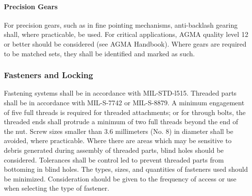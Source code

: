 \documentclass[12pt]{article}
\begin{document}
\paragraph{Precision Gears} %
For precision gears, such as in fine pointing mechanisms, anti-backlash gearing shall, where practicable, be used.
For critical applications, AGMA quality level 12 or better should be considered (see AGMA Handbook).
Where gears are required to be matched sets, they shall be identified and marked as such.

\subsubsection{Fasteners and Locking} %
Fastening systems shall be in accordance with MIL-STD-l515.
Threaded parts shall be in accordance with MIL-S-7742 or MIL-S-8879. 
A minimum engagement of five full threads is required for threaded attachments; or for through bolts, the threaded ends shall protrude a minimum of two full threads beyond the end of the nut. 
Screw sizes smaller than 3.6 millimeters (No. 8) in diameter shall be avoided, where practicable. 
Where there are areas which may be sensitive to debris generated during assembly of threaded parts, blind holes should be considered. 
Tolerances shall be control led to prevent threaded parts from bottoming in blind holes. 
The types, sizes, and quantities of fasteners used should be minimized.
Consideration should be given to the frequency of access or use when selecting the type of fastener.
\end{document}
